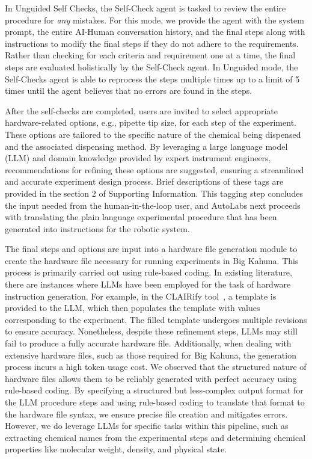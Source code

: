 \documentclass[sn-nature, twocolumn]{sn-jnl}%
\theoremstyle{thmstyleone}%
\theoremstyle{thmstyletwo}%
\theoremstyle{thmstylethree}%
\begin{document}
In Unguided Self Checks, the Self-Check agent is tasked to review the entire procedure for \textit{any} mistakes. For this mode, we provide the agent with the system prompt, the entire AI-Human conversation history, and the final steps along with instructions to modify the final steps if they do not adhere to the requirements. Rather than checking for each criteria and requirement one at a time, the final steps are evaluated holistically by the Self-Check agent. 
In Unguided mode, the Self-Checks agent is able to reprocess the steps multiple times up to a limit of 5 times until the agent believes that no errors are found in the steps.

After the self-checks are completed, users are invited to select appropriate hardware-related options, e.g., pipette tip size, for each step of the experiment. These options are tailored to the specific nature of the chemical being dispensed and the associated dispensing method. By leveraging a large language model (LLM) and domain knowledge provided by expert instrument engineers, recommendations for refining these options are suggested, ensuring a streamlined and accurate experiment design process. Brief descriptions of these tags are provided in the section 2 of Supporting Information. This tagging step concludes the input needed from the human-in-the-loop user, and AutoLabs next proceeds with translating the plain language experimental procedure that has been generated into instructions for the robotic system.

The final steps and options are input into a hardware file generation module to create the hardware file necessary for running experiments in Big Kahuna. This process is primarily carried out using rule-based coding. In existing literature, there are instances where LLMs have been employed for the task of hardware instruction generation. For example, in the CLAIRify tool~\cite{yoshikawa2023large}, a template is provided to the LLM, which then populates the template with values corresponding to the experiment. The filled template undergoes multiple revisions to ensure accuracy. Nonetheless, despite these refinement steps, LLMs may still fail to produce a fully accurate hardware file. 
Additionally, when dealing with extensive hardware files, such as those required for Big Kahuna, the generation process incurs a high token usage cost.
We observed that the structured nature of hardware files allows them to be reliably generated with perfect accuracy using rule-based coding. 
By specifying a structured but less-complex output format for the LLM procedure steps and using rule-based coding to translate that format to the hardware file syntax, we ensure precise file creation and mitigates errors. 
However, we do leverage LLMs for specific tasks within this pipeline, such as extracting chemical names from the experimental steps and determining chemical properties like molecular weight, density, and physical state.
\end{document}

